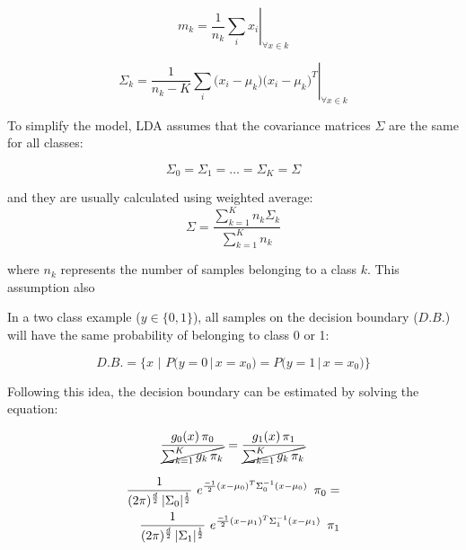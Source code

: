 \documentclass{article}
\begin{document}
\begin{equation}
\left. m_k = \frac{1}{n_k} \sum_{i}{x_i} \right\vert_{\forall x \in k}
\end{equation}

\begin{equation}
\left. \Sigma_k = \frac{1}{n_k-K} \sum_{i}{\Big( x_i - \mu_k \Big) \Big( x_i - \mu_k \Big)^T} \right\vert_{\forall x \in k}
\end{equation}


 
To simplify the model, LDA assumes that the covariance matrices $\Sigma$ are the same for all classes:

\begin{equation} 
\Sigma_0 = \Sigma_1 = \dots = \Sigma_K = \Sigma
\end{equation}

and they are usually calculated using weighted average:
\begin{equation} 
\Sigma = \frac{\sum_{k=1}^K {n_k\Sigma_k}}{\sum_{k=1}^K{n_k}}
\end{equation}

where $n_k$ represents the number of samples belonging to a class $k$. This assumption also 

In a two class example ($y \in \{0,1\}$), all samples on the decision boundary ($D.B.$) will have the same probability of belonging to class 0 or 1:

\begin{equation} 
D.B. = \Big\{x\,\, \Big| \,\,P\big(y=0 \, \big| \, x=x_0\big) = P\big(y=1 \, \big| \, x=x_0\big) \Big\}
\end{equation}

Following this idea, the decision boundary can be estimated by solving the equation:

\begin{equation} 
\frac{g_0(x) \, \pi_0} {\cancel{\sum_{k=1}^K{g_k \, \pi_k}}} = \frac{g_1(x) \, \pi_1} {\cancel{\sum_{k=1}^K{g_k \, \pi_k}}}
\end{equation}


\begin{equation} 
\begin{split}
\frac{1}{(2 \pi)^{\nicefrac{d}{2}}\, |\Sigma_0|^{\nicefrac{1}{2}}}\,\, e^{\nicefrac{-1}{2}  (x-\mu_0)^T  \Sigma_0^{-1} (x-\mu_0)}  \,\,\,\pi_0 = \\
\frac{1}{(2 \pi)^{\nicefrac{d}{2}}\, |\Sigma_1|^{\nicefrac{1}{2}}}\,\, e^{\nicefrac{-1}{2}  (x-\mu_1)^T  \Sigma_1^{-1} (x-\mu_1)}  \,\,\,\pi_1
\end{split}
\end{equation}
\end{document}
